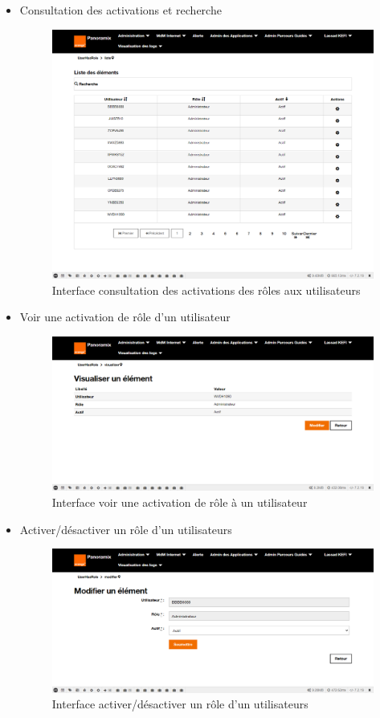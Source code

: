 \begin{itemize}
	\item Consultation des activations et recherche
	\begin{figure}[H]
		\centering
		\includegraphics[width=0.5\linewidth]{"img/screenshots/activation des roles/index"}
		\caption[Interface consultation des activations des rôles aux utilisateurs]{Interface consultation des activations des rôles aux utilisateurs}
		\label{fig:index-activation}
	\end{figure}
	
	\item Voir une activation de rôle d'un utilisateur
	\begin{figure}[H]
		\centering
		\includegraphics[width=0.7\linewidth]{"img/screenshots/activation des roles/view"}
		\caption[Interface voir une activation de rôle à un utilisateur]{Interface voir une activation de rôle à un utilisateur}
		\label{fig:view-activation}
	\end{figure}

	\item Activer/désactiver un rôle d'un utilisateurs
	\begin{figure}[H]
		\centering
		\includegraphics[width=0.7\linewidth]{"img/screenshots/activation des roles/edit"}
		\caption[Interface activer/désactiver un rôle d'un utilisateurs]{Interface activer/désactiver un rôle d'un utilisateurs}
		\label{fig:view-activation}
	\end{figure}
\end{itemize}


